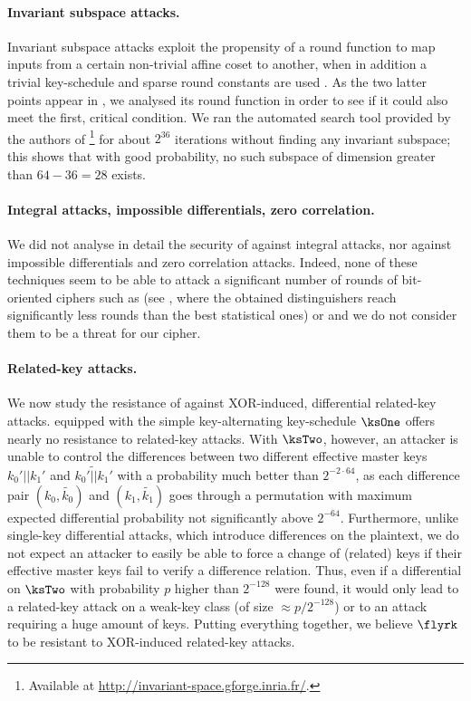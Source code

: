 \paragraph{Invariant subspace attacks.}
Invariant subspace attacks exploit the propensity of a round function to map inputs from a certain non-trivial affine coset to another, when in addition a trivial key-schedule and sparse round constants are used \cite{briceinv}.
As the two latter points appear in \fly, we analysed its round function in order to see if it could also meet the first, critical condition.
We ran the automated search tool provided by the authors of \cite{briceinv}\footnote{Available at \url{http://invariant-space.gforge.inria.fr/}.}
for about $2^{36}$ iterations without finding any invariant subspace; this shows that with good probability, no such subspace of dimension greater than $64 - 36 = 28$ exists.

\paragraph{Integral attacks, impossible differentials, zero correlation.}
We did not analyse in detail the security of \fly against integral attacks, nor against impossible differentials and zero correlation
attacks. Indeed, none of these techniques seem to be able to attack a significant number of rounds of bit-oriented ciphers such as \present
(see \eg \cite{bitintegral,presentzero,newdivision}, where the obtained distinguishers reach significantly less rounds than the best statistical ones)
or \fly and we do not consider them to be a threat
for our cipher.

\paragraph{Related-key attacks.}
We now study the resistance of \fly against XOR-induced, differential related-key attacks.
\fly equipped with the simple key-alternating key-schedule $\ksOne$ offers nearly no resistance to related-key attacks. With $\ksTwo$, however, an attacker is unable to control the
differences between two different effective master keys $k_0'||k_1'$ and $\widetilde{k_0'||k_1'}$ with a probability much better than $2^{-2\cdot64}$, as each difference pair $(k_0,\widetilde{k_0})$
and $(k_1,\widetilde{k_1})$ goes through a permutation with maximum expected differential probability not significantly above $2^{-64}$. Furthermore, unlike single-key differential attacks, which introduce differences
on the plaintext, we do not expect an attacker to easily be able to force a change of (related) keys
if their effective master keys fail to verify a difference relation. Thus, even
if a differential on $\ksTwo$ with probability $p$ higher than $2^{-128}$ were found, it would only lead to a related-key attack on a weak-key class
	(of size $\approx p/2^{-128}$) or to an attack requiring a huge amount of keys.
Putting everything together, we believe $\flyrk$ to be resistant to XOR-induced related-key attacks.

